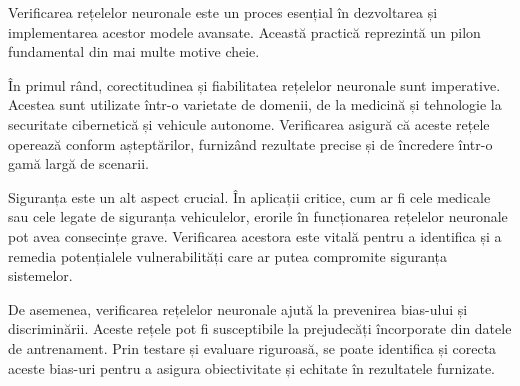 \hspace{0.5 cm} Verificarea rețelelor neuronale este un proces esențial în dezvoltarea și implementarea acestor modele avansate. Această practică reprezintă un pilon fundamental din mai multe motive cheie.

În primul rând, corectitudinea și fiabilitatea rețelelor neuronale sunt imperative. Acestea sunt utilizate într-o varietate de domenii, de la medicină și tehnologie la securitate cibernetică și vehicule autonome. Verificarea asigură că aceste rețele operează conform așteptărilor, furnizând rezultate precise și de încredere într-o gamă largă de scenarii.

Siguranța este un alt aspect crucial. În aplicații critice, cum ar fi cele medicale sau cele legate de siguranța vehiculelor, erorile în funcționarea rețelelor neuronale pot avea consecințe grave. Verificarea acestora este vitală pentru a identifica și a remedia potențialele vulnerabilități care ar putea compromite siguranța sistemelor.

De asemenea, verificarea rețelelor neuronale ajută la prevenirea bias-ului și discriminării. Aceste rețele pot fi susceptibile la prejudecăți încorporate din datele de antrenament. Prin testare și evaluare riguroasă, se poate identifica și corecta aceste bias-uri pentru a asigura obiectivitate și echitate în rezultatele furnizate.